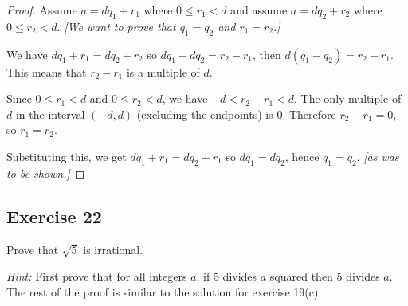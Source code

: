 \documentclass[14pt]{extarticle}
\begin{document}
\begin{proof}
    Assume $a = dq_1 + r_1$ where $0 \leq r_1 < d$ and assume $a = dq_2 + r_2$ where $0 \leq r_2 < d$. {\it [We want to prove that $q_1 = q_2$ and $r_1 = r_2$.]}

    We have $dq_1 + r_1 = dq_2 + r_2$ so $dq_1 - dq_2 = r_2 - r_1$, then $d(q_1 - q_2) = r_2 - r_1$. This means that $r_2 - r_1$ is a multiple of $d$.

    Since $0 \leq r_1 < d$ and $0 \leq r_2 < d$, we have $-d < r_2 - r_1 < d$. The only multiple of $d$ in the interval $(-d, d)$ (excluding the endpoints) is 0. Therefore $r_2 - r_1 = 0$, so $r_1 = r_2$.

    Substituting this, we get $dq_1 + r_1 = dq_2 + r_1$ so $dq_1 = dq_2$, hence $q_1 = q_2$, {\it [as was to be shown.]}
\end{proof}

\subsection{Exercise 22}
Prove that $\sqrt{5}$ is irrational.

    {\it Hint:} First prove that for all integers $a$, if 5 divides $a$ squared then 5 divides $a$. The rest of the proof is similar to the solution for exercise 19(c).
\end{document}
